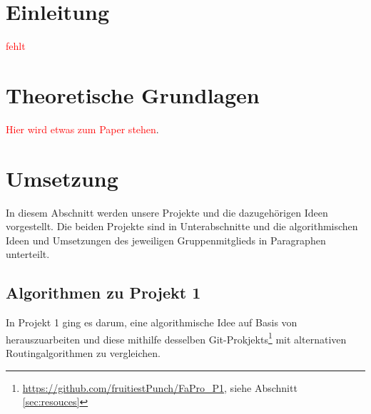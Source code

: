 \documentclass[sigconf, nonacm, review]{acmart}
\begin{document}
\section{Einleitung}
\textcolor{red}{fehlt}

\section{Theoretische Grundlagen}
\textcolor{red}{Hier wird etwas zum Paper stehen}\cite{foerster2021}.
\section{Umsetzung}
In diesem Abschnitt werden unsere Projekte und die dazugeh\"origen Ideen vorgestellt.
Die beiden Projekte sind in Unterabschnitte und die algorithmischen Ideen und Umsetzungen des jeweiligen Gruppenmitglieds in Paragraphen unterteilt. 
\subsection{Algorithmen zu Projekt 1}
In Projekt 1 ging es darum, eine algorithmische Idee auf Basis von \cite{foerster2021} herauszuarbeiten und diese mithilfe desselben Git-Prokjekts\footnote{\url{https://github.com/fruitiestPunch/FaPro_P1}, siehe Abschnitt \ref{sec:resouces}} mit alternativen Routingalgorithmen zu vergleichen. 
\end{document}
